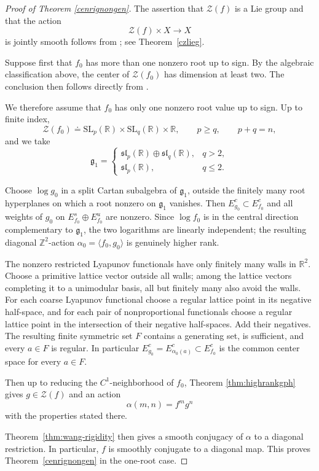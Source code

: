 \documentclass[11pt]{amsart}
\numberwithin{equation}{section}
\newcommand{\SL}{\mathrm{SL}}
\theoremstyle{plain}
\begin{document}
\begin{proof}[Proof of Theorem \ref{cenrignongen}]
The assertion that $\mathcal Z(f)$ is a Lie group and that the action
\[
\mathcal Z(f)\times X\longrightarrow X
\]
is jointly smooth follows from
\cite[Theorem~3.1]{Wang}; see Theorem~\ref{czlieg}.

Suppose first that $f_0$ has more than one nonzero root up to sign.
By the algebraic classification above, the center of
$\mathcal Z(f_0)$ has dimension at least two. The conclusion then follows directly from
\cite[Theorem~1.2]{Wang26}.

We therefore assume that $f_0$ has only one nonzero root value up to
sign. Up to finite
index,
\[
\mathcal Z(f_0)
 \doteq
 \SL_p(\mathbb R)\times\SL_q(\mathbb R)\times\mathbb R,
\qquad p\ge q,\qquad p+q=n,
\]
and we take
\[
\mathfrak g_1=
\begin{cases}
\mathfrak{sl}_p(\mathbb R)\oplus
\mathfrak{sl}_q(\mathbb R),&q>2,\\
\mathfrak{sl}_p(\mathbb R),&q\le2.
\end{cases}
\]



Choose $\log g_0$ in a split Cartan subalgebra of
$\mathfrak g_1$, outside the finitely many root
hyperplanes on which a root nonzero on $\mathfrak g_1$ vanishes.  Then
$E^c_{g_0}\subset E^c_{f_0}$ and all weights of $g_0$ on
$E^s_{f_0}\oplus E^u_{f_0}$ are nonzero.  Since $\log f_0$ is in the
central direction complementary to $\mathfrak g_1$, the two logarithms
are linearly independent; the resulting diagonal $\mathbb Z^2$-action
$\alpha_0=\langle f_0,g_0\rangle$ is genuinely higher rank.

The nonzero restricted Lyapunov functionals have only finitely many
walls in $\mathbb R^2$.  Choose a primitive lattice vector outside all
walls; among the lattice vectors completing it to a unimodular basis,
all but finitely many also avoid the walls.  For each coarse Lyapunov
functional choose a regular lattice point in its negative half-space,
and for each pair of nonproportional functionals choose a regular lattice
point in the intersection of their negative half-spaces.  Add their
negatives.  The resulting finite
symmetric set $F$ contains a generating set, is sufficient, and every
$a\in F$ is regular.  In particular
$E^c_{g_0}=E^c_{\alpha_0(a)}\subset E^c_{f_0}$ is the common center space for every $a\in F$.

Then up to reducing the
$C^1$-neighborhood of $f_0$, Theorem \ref{thm:highrankgph} gives
$g\in\mathcal Z(f)$ and an action
\[
\alpha(m,n)=f^m g^n
\]
with the properties stated there.





Theorem~\ref{thm:wang-rigidity}  then gives a smooth conjugacy
of $\alpha$ to a diagonal restriction.  In particular, $f$ is smoothly
conjugate to a diagonal map.  This proves
Theorem~\ref{cenrignongen} in the one-root case.

\end{proof}
\end{document}
